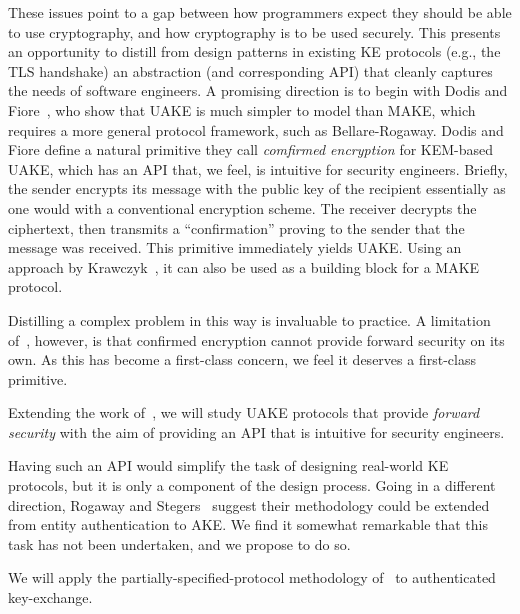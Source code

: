 These issues point to a gap between how programmers expect they should be able
to use cryptography, and how cryptography is to be used securely. This presents
an opportunity to distill from design patterns in existing KE protocols (e.g.,
the TLS handshake) an abstraction (and corresponding API) that cleanly captures
the needs of software engineers.
%
A promising direction is to begin with Dodis and
Fiore~\cite{dodis2017unilateral}, who show that UAKE is much simpler to model
than MAKE, which requires a more general protocol framework, such as
Bellare-Rogaway.
%
Dodis and Fiore define a natural primitive they call
\emph{comfirmed encryption} for KEM-based UAKE, which has an API that, we
feel, is intuitive for security engineers. Briefly, the sender encrypts its
message with the public key of the recipient essentially as one would with a
conventional encryption scheme. The receiver decrypts the ciphertext, then
transmits a ``confirmation'' proving to the sender that the message was
received.
%
This primitive immediately yields UAKE. Using an approach by
Krawczyk~\cite{krawczyk2016unilateral-to-mutual}, it can also be used as a
building block for a MAKE protocol.

Distilling a complex problem in this way is invaluable to practice. A
limitation of~\cite{dodis2017unilateral}, however, is that confirmed encryption
cannot provide forward security on its own. As this has become a first-class
concern, we feel it deserves a first-class primitive.
%

\begin{task}
  Extending the work of~\cite{dodis2017unilateral}, we will study UAKE protocols
  that provide \emph{forward security} with the aim of providing an API that is
  intuitive for security engineers.
\end{task}

Having such an API would simplify the task of designing real-world KE
protocols, but it is only a component of the design process.
Going in a different direction, Rogaway and Stegers~\cite{RS09} suggest their
methodology could be extended from entity authentication to AKE. We find it
somewhat remarkable that this task has not been undertaken, and we propose to do
so.
\begin{task}
  We will apply the partially-specified-protocol methodology of~\cite{RS09} to
  authenticated key-exchange.
\end{task}


